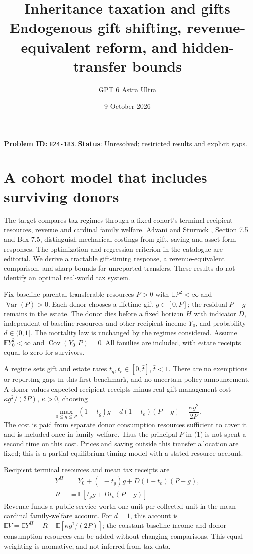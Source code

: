 \documentclass[11pt]{article}
\title{Inheritance taxation and gifts\\\large Endogenous gift shifting, revenue-equivalent reform, and hidden-transfer bounds}
\author{GPT 6 Astra Ultra}
\date{9 October 2026}
\theoremstyle{remark}
\newcommand{\E}{\mathbb E}
\newcommand{\Var}{\operatorname{Var}}
\newcommand{\Cov}{\operatorname{Cov}}
\begin{document}
\maketitle
\noindent\textbf{Problem ID:} \texttt{H24-183}. \textbf{Status:} Unresolved; restricted results and explicit gaps.

\section{A cohort model that includes surviving donors}
The target compares tax regimes through a fixed cohort's terminal recipient
resources, revenue and cardinal family welfare. Advani and Sturrock
\cite{ifs}, Section 7.5 and Box 7.5, distinguish mechanical costings from
gift, saving and asset-form responses. The optimization and regression
criterion in the catalogue are editorial. We derive a tractable gift-timing
response, a revenue-equivalent comparison, and sharp bounds for unreported
transfers. These results do not identify an optimal real-world tax system.

Fix baseline parental transferable resources $P>0$ with
$\E P^2<\infty$ and $\Var(P)>0$. Each donor chooses a lifetime gift
$g\in[0,P]$; the residual $P-g$ remains in the estate. The donor dies
before a fixed horizon $H$ with indicator $D$, independent of baseline
resources and other recipient income $Y_0$, and probability $d\in(0,1]$.
The mortality law is unchanged by the regimes considered. Assume
$\E Y_0^2<\infty$ and $\Cov(Y_0,P)=0$. All families are included,
with estate receipts equal to zero for survivors.

A regime sets gift and estate rates $t_g,t_e\in[0,\bar t]$, $\bar t<1$.
There are no exemptions or reporting gaps in this first benchmark, and no
uncertain policy announcement. A donor values expected recipient receipts
minus real gift-management cost $\kappa g^2/(2P)$, $\kappa>0$, choosing
\[
 \max_{0\leq g\leq P}
 (1-t_g)g+d(1-t_e)(P-g)-\frac{\kappa g^2}{2P}. \tag{1}
\]
The cost is paid from separate donor consumption resources sufficient to
cover it and is included once in family welfare. Thus the principal $P$
in (1) is not spent a second time on this cost. Prices and saving outside
this transfer allocation are fixed; this is a partial-equilibrium timing
model with a stated resource account.

Recipient terminal resources and mean tax receipts are
\begin{align}
 Y^H&=Y_0+(1-t_g)g+D(1-t_e)(P-g),\tag{2}\\
 R&=\E[t_gg+Dt_e(P-g)].\tag{3}
\end{align}
Revenue funds a public service worth one unit per collected unit in the
mean cardinal family-welfare account. For $d=1$, this account is
$\E V=\E Y^H+R-\E[\kappa g^2/(2P)]$; the constant baseline income
and donor consumption resources can be added without changing comparisons.
This equal weighting is normative, and not inferred from tax data.
\end{document}
